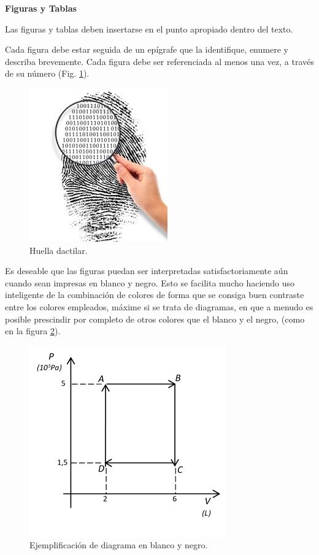 \textbf{Figuras y Tablas}

Las figuras y tablas deben insertarse en el punto apropiado dentro del texto.

Cada figura debe estar seguida de un epígrafe que la identifique, enumere y describa brevemente. Cada figura debe ser referenciada al menos una vez, a través de su número (Fig. \ref{fig:huella}).

\begin{figure}[H]
\begin{center}
\includegraphics[scale = .5]{./capitulo_04/huella}
\caption{Huella dactilar.}
\label{fig:huella}
\end{center}
\end{figure}

Es deseable que las figuras puedan ser interpretadas satisfactoriamente aún cuando sean impresas en blanco y negro. Esto se facilita mucho haciendo uso inteligente de la combinación de colores de forma que se consiga buen contraste entre los colores empleados, máxime si se trata de diagramas, en que a menudo es posible prescindir por completo de otros colores que el blanco y el negro, (como en la figura \ref{fig:termodin}).

\begin{figure}[H]
\begin{center}
\includegraphics{./capitulo_04/termodin.png}
\caption{Ejemplificación de diagrama en blanco y negro.}
\label{fig:termodin}
\end{center}
\end{figure}

